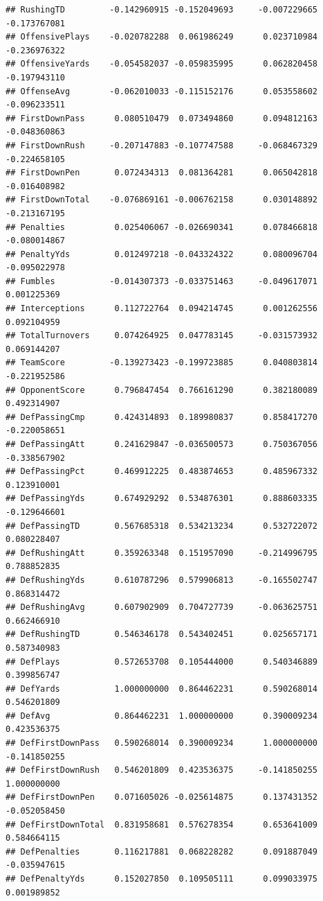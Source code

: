 \documentclass[
]{book}
\begin{document}
\begin{verbatim}
## RushingTD         -0.142960915 -0.152049693     -0.007229665     -0.173767081
## OffensivePlays    -0.020782288  0.061986249      0.023710984     -0.236976322
## OffensiveYards    -0.054582037 -0.059835995      0.062820458     -0.197943110
## OffenseAvg        -0.062010033 -0.115152176      0.053558602     -0.096233511
## FirstDownPass      0.080510479  0.073494860      0.094812163     -0.048360863
## FirstDownRush     -0.207147883 -0.107747588     -0.068467329     -0.224658105
## FirstDownPen       0.072434313  0.081364281      0.065042818     -0.016408982
## FirstDownTotal    -0.076869161 -0.006762158      0.030148892     -0.213167195
## Penalties          0.025406067 -0.026690341      0.078466818     -0.080014867
## PenaltyYds         0.012497218 -0.043324322      0.080096704     -0.095022978
## Fumbles           -0.014307373 -0.033751463     -0.049617071      0.001225369
## Interceptions      0.112722764  0.094214745      0.001262556      0.092104959
## TotalTurnovers     0.074264925  0.047783145     -0.031573932      0.069144207
## TeamScore         -0.139273423 -0.199723885      0.040803814     -0.221952586
## OpponentScore      0.796847454  0.766161290      0.382180089      0.492314907
## DefPassingCmp      0.424314893  0.189980837      0.858417270     -0.220058651
## DefPassingAtt      0.241629847 -0.036500573      0.750367056     -0.338567902
## DefPassingPct      0.469912225  0.483874653      0.485967332      0.123910001
## DefPassingYds      0.674929292  0.534876301      0.888603335     -0.129646601
## DefPassingTD       0.567685318  0.534213234      0.532722072      0.080228407
## DefRushingAtt      0.359263348  0.151957090     -0.214996795      0.788852835
## DefRushingYds      0.610787296  0.579906813     -0.165502747      0.868314472
## DefRushingAvg      0.607902909  0.704727739     -0.063625751      0.662466910
## DefRushingTD       0.546346178  0.543402451      0.025657171      0.587340983
## DefPlays           0.572653708  0.105444000      0.540346889      0.399856747
## DefYards           1.000000000  0.864462231      0.590268014      0.546201809
## DefAvg             0.864462231  1.000000000      0.390009234      0.423536375
## DefFirstDownPass   0.590268014  0.390009234      1.000000000     -0.141850255
## DefFirstDownRush   0.546201809  0.423536375     -0.141850255      1.000000000
## DefFirstDownPen    0.071605026 -0.025614875      0.137431352     -0.052058450
## DefFirstDownTotal  0.831958681  0.576278354      0.653641009      0.584664115
## DefPenalties       0.116217881  0.068228282      0.091887049     -0.035947615
## DefPenaltyYds      0.152027850  0.109505111      0.099033975      0.001989852

\end{verbatim}
\end{document}
